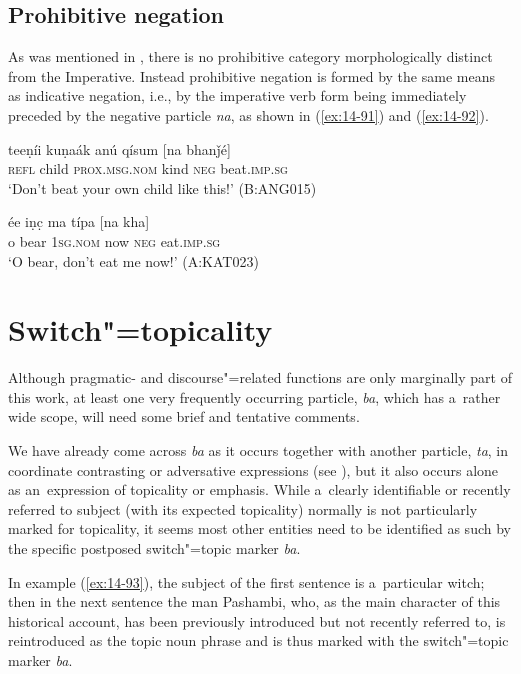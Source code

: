 \subsection{Prohibitive negation}
\label{subsec:14-3-5}


As was mentioned in , there is no prohibitive category morphologically distinct from the Imperative. Instead prohibitive negation is formed by the same means as indicative negation, i.e., by the imperative verb form being immediately preceded by the negative particle \textit{na}, as shown in (\ref{ex:14-91}) and (\ref{ex:14-92}).

\begin{exe}
\ex
\label{ex:14-91}
\gll teeṇíi kuṇaák anú qísum [na bhanǰé] \\
\textsc{refl} child \textsc{prox.msg.nom} kind \textsc{neg} beat.\textsc{imp.sg}  \\
\glt `Don't beat your own child like this!' (B:ANG015)

\ex
\label{ex:14-92}
\gll ée iṇc̣ ma típa [na kha] \\
o bear \textsc{1sg.nom} now \textsc{neg} eat.\textsc{imp.sg } \\
\glt `O bear, don't eat me now!' (A:KAT023)
\end{exe}

\section{Switch"=topicality}
\label{sec:14-4}


Although pragmatic- and discourse"=related functions are only marginally part of this work, at least one very frequently occurring particle, \textit{ba}, which has a~rather wide scope, will need some brief and tentative comments.



We have already come across \textit{ba} as it occurs together with another particle, \textit{ta}, in coordinate contrasting or adversative expressions (see ), but it also occurs alone as an~expression of topicality or emphasis. While a~clearly identifiable or recently referred to subject (with its expected topicality) normally is not particularly marked for topicality, it seems most other entities need to be identified as such by the specific postposed switch"=topic \citep[149]{andrews2007} marker \textit{ba}.



In example (\ref{ex:14-93}), the subject of the first sentence is a~particular witch; then in the next sentence the man Pashambi, who, as the main character of this historical account, has been previously introduced but not recently referred to, is reintroduced as the topic noun phrase and is thus marked with the switch"=topic marker \textit{ba}.


